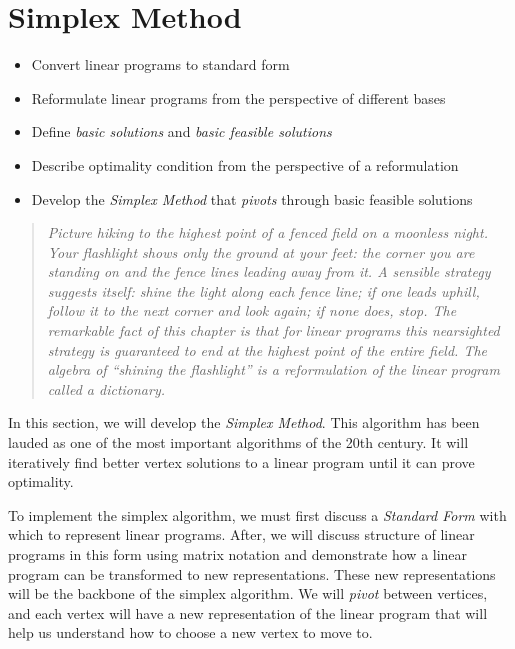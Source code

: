 \chapter{Simplex Method}
\label{ch:simplex-dictionary}
\begin{outcome}
\begin{itemize}
\item Convert linear programs to standard form
\item Reformulate linear programs from the perspective of different bases
\item Define \emph{basic solutions} and \emph{basic feasible solutions}
\item Describe optimality condition from the perspective of a reformulation
\item Develop the \emph{Simplex Method} that \emph{pivots} through basic feasible solutions
\end{itemize}
\end{outcome}

\begin{quote}
\itshape Picture hiking to the highest point of a fenced field on a moonless night. Your flashlight shows only the ground at your feet: the corner you are standing on and the fence lines leading away from it. A sensible strategy suggests itself: shine the light along each fence line; if one leads uphill, follow it to the next corner and look again; if none does, stop. The remarkable fact of this chapter is that for linear programs this nearsighted strategy is guaranteed to end at the highest point of the entire field. The algebra of ``shining the flashlight'' is a reformulation of the linear program called a \emph{dictionary}.
\end{quote}

In this section, we will develop the \emph{Simplex Method}.  This algorithm has been lauded as one of the most important algorithms of the 20th century.  It will iteratively find better vertex solutions to a linear program until it can prove optimality.

To implement the simplex algorithm, we must first discuss a \emph{Standard Form} with which to represent linear programs.   After, we will discuss structure of linear programs in this form using matrix notation and demonstrate how a linear program can be transformed to new representations.  These new representations will be the backbone of the simplex algorithm.  We will \emph{pivot} between vertices, and each vertex will have a new representation of the linear program that will help us understand how to choose a new vertex to move to.

